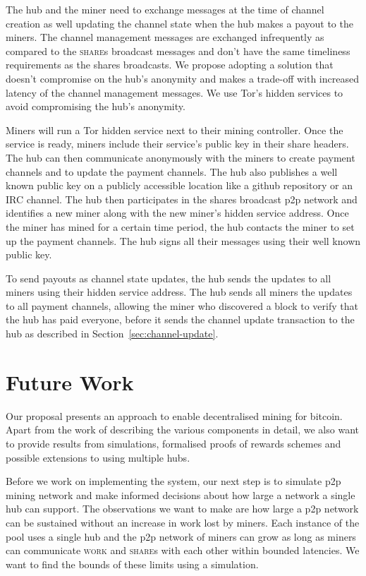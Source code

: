 \documentclass{article}
\begin{document}
The hub and the miner need to exchange messages at the time of channel
creation as well updating the channel state when the hub makes a
payout to the miners. The channel management messages are exchanged
infrequently as compared to the \textsc{share}s broadcast messages and
don't have the same timeliness requirements as the shares
broadcasts. We propose adopting a solution that doesn't compromise on
the hub's anonymity and makes a trade-off with increased latency of
the channel management messages. We use Tor's hidden services to avoid
compromising the hub's anonymity.

Miners will run a Tor hidden service next to their mining
controller. Once the service is ready, miners include their service's
public key in their share headers. The hub can then communicate
anonymously with the miners to create payment channels and to update
the payment channels. The hub also publishes a well known public key
on a publicly accessible location like a github repository or an IRC
channel. The hub then participates in the shares broadcast p2p network
and identifies a new miner along with the new miner's hidden service
address. Once the miner has mined for a certain time period, the hub
contacts the miner to set up the payment channels. The hub signs all
their messages using their well known public key.

To send payouts as channel state updates, the hub sends the updates to
all miners using their hidden service address. The hub sends all
miners the updates to all payment channels, allowing the miner who
discovered a block to verify that the hub has paid everyone, before it
sends the channel update transaction to the hub as described in
Section~\ref{sec:channel-update}.

\section{Future Work}

Our proposal presents an approach to enable decentralised mining for
bitcoin. Apart from the work of describing the various components in
detail, we also want to provide results from simulations, formalised
proofs of rewards schemes and possible extensions to using multiple
hubs.

Before we work on implementing the system, our next step is to
simulate p2p mining network and make informed decisions about how
large a network a single hub can support. The observations we want to
make are how large a p2p network can be sustained without an increase
in work lost by miners. Each instance of the pool uses a single hub
and the p2p network of miners can grow as long as miners can
communicate \textsc{work} and \textsc{share}s with each other within
bounded latencies. We want to find the bounds of these limits using a
simulation.
\end{document}
